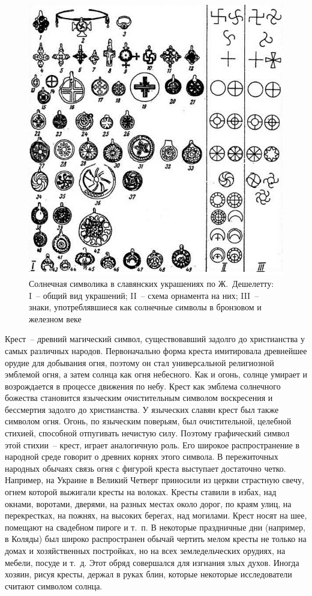 \documentclass[pscyr,chapters]{hedwork}
\begin{document}
  \begin{figure}[ht]
    \center
    \includegraphics[width=.8\textwidth]{sl_3_1}
    \caption{Солнечная символика в славянских украшениях по Ж.~Дешелетту:\\
      I~-- общий вид украшений; II~-- схема орнамента на них; III~-- знаки,
      употреблявшиеся как солнечные символы в бронзовом и железном веке}    
    \label{pic42}
  \end{figure}

  Крест~-- древний магический символ, существовавший задолго до христианства у
  самых различных народов. Первоначально форма креста имитировала древнейшее
  орудие для добывания огня, поэтому он стал универсальной религиозной эмблемой
  огня, а затем солнца как огня небесного. Как и огонь, солнце умирает и
  возрождается в процессе движения по небу. Крест как эмблема солнечного
  божества становится языческим очистительным символом воскресения и бессмертия
  задолго до христианства. У языческих славян крест был также символом огня.
  Огонь, по языческим поверьям, был очистительной, целебной стихией, способной
  отпугивать нечистую силу. Поэтому графический символ этой стихии~-- крест,
  играет аналогичную роль. Его широкое распространение в народной среде говорит
  о древних корнях этого символа. В пережиточных народных обычаях связь огня с
  фигурой креста выступает достаточно четко. Например, на Украине в Великий
  Четверг приносили из церкви страстную свечу, огнем которой выжигали кресты на
  волоках. Кресты ставили в избах, над окнами, воротами, дверями, на разных
  местах около дорог, по краям улиц, на перекрестках, на пожнях, на высоких
  берегах, над могилами. Крест носят на шее, помещают на свадебном пироге и
  т.~п. В некоторые праздничные дни (например, в Коляды) был широко
  распространен обычай чертить мелом кресты не только на домах и хозяйственных
  постройках, но на всех земледельческих орудиях, на мебели, посуде и т.~д. Этот
  обряд совершался для изгнания злых духов. Иногда хозяин, рисуя кресты, держал
  в руках блин, которые некоторые исследователи считают символом солнца.
\end{document}
